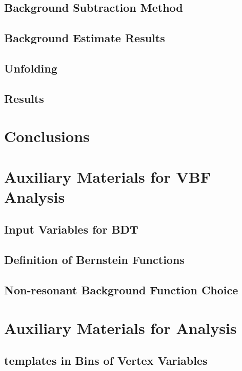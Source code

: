 \documentclass{report}
\begin{document}
\section{Background Subtraction Method}

\clearpage

\section{Background Estimate Results}

\clearpage

\section{Unfolding}
\label{sec:gbb-unfolding}

\clearpage

\section{Results}
\label{sec:gbb-results}

\clearpage

\chapter{Conclusions}
\clearpage

\appendix
\chapter{Auxiliary Materials for VBF \Hbb Analysis}
\section{Input Variables for BDT}

\section{Definition of Bernstein Functions}

\section{Non-resonant Background Function Choice}


\chapter{Auxiliary Materials for \gbb Analysis}
\section{\subsdzero templates in Bins of Vertex Variables}

\clearpage
\end{document}
